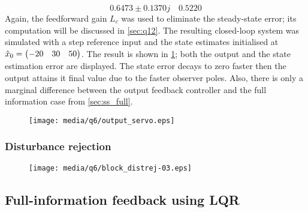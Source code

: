 $$0.6473 \pm 0.1370j \quad  0.5220$$
Again, the feedforward gain $L_c$ was used to eliminate the steady-state error; its computation will be discussed in \cref{sec:q12}. The resulting closed-loop system was simulated with a step reference input and the state estimates initialised at $\hat{x}_0 = \mqty(-20 & 30 & 50)$. The result is shown in \cref{fig:q6_output_servo}; both the output and the state estimation error are displayed. The state error decays to zero faster then the output attains it final value due to the faster observer poles. Also, there is only a marginal difference between the output feedback controller and the full information case from \cref{sec:ss_full}.
\begin{figure}[h!]
    \centering
    \texttt{[image: media/q6/output\_servo.eps]}
    \caption{}
    \label{fig:q6_output_servo}
\end{figure}
\subsubsection{Disturbance rejection}
\begin{figure}[h!]
    \centering
    \texttt{[image: media/q6/block\_distrej-03.eps]}
    \caption{}
    \label{fig:q6_block_distrej}
\end{figure}

\subsection{Full-information feedback using LQR}
\label{sec:ss_lqr}